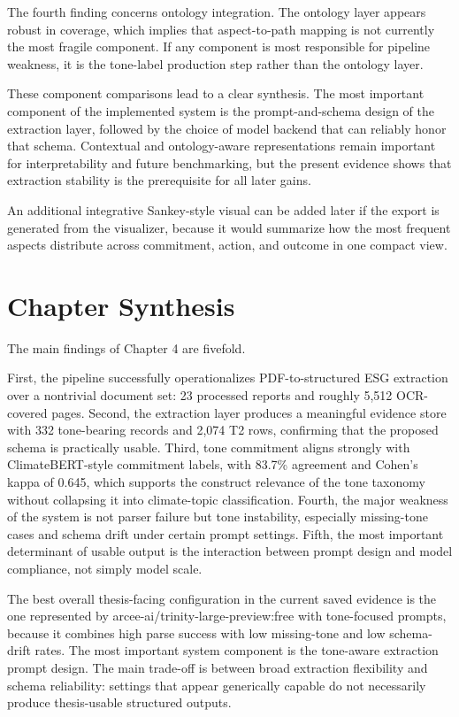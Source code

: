 \documentclass[english, online, cse, master]{dithesis}
\begin{document}
The fourth finding concerns ontology integration. The ontology layer appears robust in coverage, which implies that aspect-to-path mapping is not currently the most fragile component. If any component is most responsible for pipeline weakness, it is the tone-label production step rather than the ontology layer.

These component comparisons lead to a clear synthesis. The most important component of the implemented system is the prompt-and-schema design of the extraction layer, followed by the choice of model backend that can reliably honor that schema. Contextual and ontology-aware representations remain important for interpretability and future benchmarking, but the present evidence shows that extraction stability is the prerequisite for all later gains.

An additional integrative Sankey-style visual can be added later if the export is generated from the visualizer, because it would summarize how the most frequent aspects distribute across commitment, action, and outcome in one compact view.

\section{Chapter Synthesis}

The main findings of Chapter 4 are fivefold.

First, the pipeline successfully operationalizes PDF-to-structured ESG extraction over a nontrivial document set: 23 processed reports and roughly 5,512 OCR-covered pages. Second, the extraction layer produces a meaningful evidence store with 332 tone-bearing records and 2,074 T2 rows, confirming that the proposed schema is practically usable. Third, tone commitment aligns strongly with ClimateBERT-style commitment labels, with 83.7\% agreement and Cohen’s kappa of 0.645, which supports the construct relevance of the tone taxonomy without collapsing it into climate-topic classification. Fourth, the major weakness of the system is not parser failure but tone instability, especially missing-tone cases and schema drift under certain prompt settings. Fifth, the most important determinant of usable output is the interaction between prompt design and model compliance, not simply model scale.

The best overall thesis-facing configuration in the current saved evidence is the one represented by arcee-ai/trinity-large-preview:free with tone-focused prompts, because it combines high parse success with low missing-tone and low schema-drift rates. The most important system component is the tone-aware extraction prompt design. The main trade-off is between broad extraction flexibility and schema reliability: settings that appear generically capable do not necessarily produce thesis-usable structured outputs.
\end{document}
